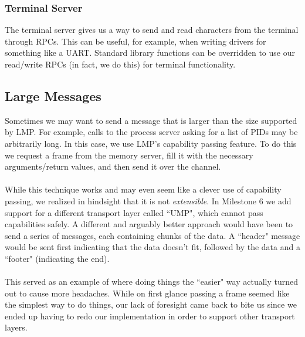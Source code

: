 \subsubsection{Terminal Server}
The terminal server gives us a way to send and read characters from the terminal through RPCs. This can be useful, for example, when writing drivers for something like a UART. Standard library functions can be overridden to use our read/write RPCs (in fact, we do this) for terminal functionality.

\subsection{Large Messages}
Sometimes we may want to send a message that is larger than the size supported by LMP. For example, calls to the process server asking for a list of PIDs may be arbitrarily long. In this case, we use LMP's capability passing feature. To do this we request a frame from the memory server, fill it with the necessary arguments/return values, and then send it over the channel.
\\\\
While this technique works and may even seem like a clever use of capability passing, we realized in hindsight that it is not \textit{extensible}. In Milestone 6 we add support for a different transport layer called ``UMP", which cannot pass capabilities safely. A different and arguably better approach would have been to send a series of messages, each containing chunks of the data. A ``header" message would be sent first indicating that the data doesn't fit, followed by the data and a ``footer" (indicating the end).
\\\\
This served as an example of where doing things the ``easier" way actually turned out to cause more headaches. While on first glance passing a frame seemed like the simplest way to do things, our lack of foresight came back to bite us since we ended up having to redo our implementation in order to support other transport layers.

